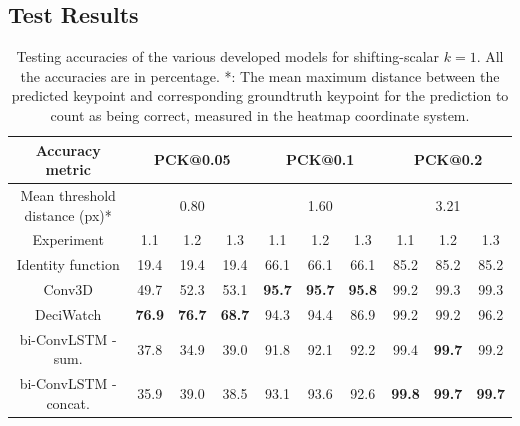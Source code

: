 \documentclass[./main.tex]{subfiles}
\begin{document}
\subsection{Test Results}
\label{subsec:finetune_test_res}
\begin{table}[htbp]
    \begin{tabular}{c||ccc|ccc|ccc}
        \hline
        Accuracy metric & \multicolumn{3}{c}{PCK@0.05} & \multicolumn{3}{c}{PCK@0.1} & \multicolumn{3}{c}{PCK@0.2} \\
        \hline
        Mean threshold distance (px)* & \multicolumn{3}{c}{0.80} & \multicolumn{3}{c}{1.60} & \multicolumn{3}{c}{3.21} \\
        \hline
        Experiment & 1.1 & 1.2 & 1.3 & 1.1 & 1.2 & 1.3 & 1.1 & 1.2 & 1.3 \\
        \hline
        \hline
        Identity function & 19.4 & 19.4 & 19.4 & 66.1 & 66.1 & 66.1 & 85.2 & 85.2 & 85.2 \\
        Conv3D & 49.7 & 52.3 & 53.1 & \textbf{95.7} & \textbf{95.7} & \textbf{95.8} & 99.2 & 99.3 & 99.3 \\
        DeciWatch & \textbf{76.9} & \textbf{76.7} & \textbf{68.7} & 94.3 & 94.4 & 86.9 & 99.2 & 99.2 & 96.2 \\
        bi-ConvLSTM - sum. & 37.8 & 34.9 & 39.0 & 91.8 & 92.1 & 92.2 & 99.4 & \textbf{99.7} & 99.2 \\
        bi-ConvLSTM - concat. & 35.9 & 39.0 & 38.5 & 93.1 & 93.6 & 92.6 & \textbf{99.8} & \textbf{99.7} & \textbf{99.7} \\
        \hline
    \end{tabular}
    \caption{Testing accuracies of the various developed models for shifting-scalar $k = 1$. All the accuracies are in percentage. *: The mean maximum distance between the predicted keypoint and corresponding groundtruth keypoint for the prediction to count as being correct, measured in the heatmap coordinate system.}
    \label{tab:finetune_test_accs_1}
\end{table}
\end{document}

